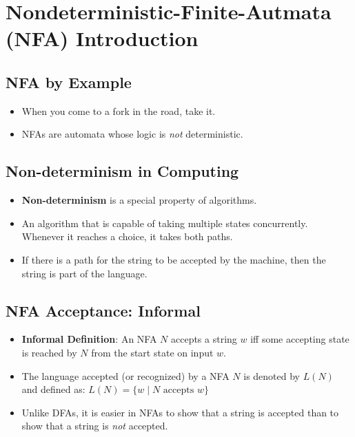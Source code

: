 \documentclass[12pt]{article}
\date{February 4, 2021}
\begin{document}
\maketitle

\section{Nondeterministic-Finite-Autmata (NFA) Introduction}

\subsection{NFA by Example}
\begin{itemize}
    \item When you come to a fork in the road, take it.
    \item NFAs are automata whose logic is \textit{not} deterministic.
\end{itemize}

\subsection{Non-determinism in Computing}
\begin{itemize}
    \item \textbf{Non-determinism} is a special property of algorithms.
    \item An algorithm that is capable of taking multiple states concurrently. Whenever it reaches a choice, it takes both paths.
    \item If there is a path for the string to be accepted by the machine, then the string is part of the language.
\end{itemize}

\subsection{NFA Acceptance: Informal}
\begin{itemize}
    \item \textbf{Informal Definition}: An NFA $N$ accepts a string $w$ iff some accepting state is reached by $N$ from the start state on input $w$.
    \item The language accepted (or recognized) by a NFA $N$ is denoted by $L(N)$ and defined as: $L(N) = \{ w \mid N \text{ accepts } w \}$
    \item Unlike DFAs, it is easier in NFAs to show that a string is accepted than to show that a string is \textit{not} accepted.
\end{itemize}
\end{document}
